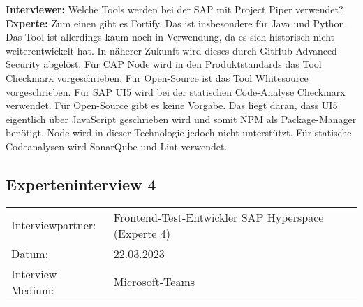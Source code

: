 \begin{linenumbers}
    \textbf{Interviewer:} Welche Tools werden bei der SAP mit Project Piper verwendet?\\
    \textbf{Experte:} Zum einen gibt es Fortify. Das ist insbesondere für Java und Python. Das Tool ist allerdings kaum noch in Verwendung, da es sich historisch nicht weiterentwickelt hat. In näherer Zukunft wird dieses durch GitHub Advanced Security abgelöst. Für CAP Node wird in den Produktstandards das Tool Checkmarx vorgeschrieben. Für Open-Source ist das Tool Whitesource vorgeschrieben. Für SAP UI5 wird bei der statischen Code-Analyse Checkmarx verwendet. Für Open-Source gibt es keine Vorgabe. Das liegt daran, dass UI5 eigentlich über JavaScript geschrieben wird und somit NPM als Package-Manager benötigt. Node wird in dieser Technologie jedoch nicht unterstützt. Für statische Codeanalysen wird SonarQube und Lint verwendet.
\end{linenumbers}

\newpage
\resetlinenumber
\subsection{Experteninterview 4}
	\begin{tabular}{ l l }
		Interviewpartner: & Frontend-Test-Entwickler SAP Hyperspace (Experte 4)\\
		Datum: & 22.03.2023\\
		Interview-Medium: & Microsoft-Teams\\
\end{tabular}\\\\

